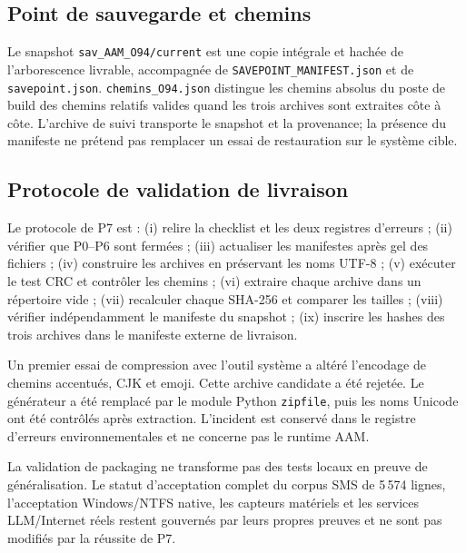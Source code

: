 \documentclass[11pt,a4paper]{article}
\begin{document}
\subsection{Point de sauvegarde et chemins}
Le snapshot \texttt{sav\_AAM\_O94/current} est une copie intégrale et hachée de l'arborescence livrable, accompagnée de \texttt{SAVEPOINT\_MANIFEST.json} et de \texttt{savepoint.json}. \texttt{chemins\_O94.json} distingue les chemins absolus du poste de build des chemins relatifs valides quand les trois archives sont extraites côte à côte. L'archive de suivi transporte le snapshot et la provenance; la présence du manifeste ne prétend pas remplacer un essai de restauration sur le système cible.

\subsection{Protocole de validation de livraison}
Le protocole de P7 est : (i) relire la checklist et les deux registres d'erreurs ; (ii) vérifier que P0--P6 sont fermées ; (iii) actualiser les manifestes après gel des fichiers ; (iv) construire les archives en préservant les noms UTF-8 ; (v) exécuter le test CRC et contrôler les chemins ; (vi) extraire chaque archive dans un répertoire vide ; (vii) recalculer chaque SHA-256 et comparer les tailles ; (viii) vérifier indépendamment le manifeste du snapshot ; (ix) inscrire les hashes des trois archives dans le manifeste externe de livraison.

Un premier essai de compression avec l'outil système a altéré l'encodage de chemins accentués, CJK et emoji. Cette archive candidate a été rejetée. Le générateur a été remplacé par le module Python \texttt{zipfile}, puis les noms Unicode ont été contrôlés après extraction. L'incident est conservé dans le registre d'erreurs environnementales et ne concerne pas le runtime AAM.

La validation de packaging ne transforme pas des tests locaux en preuve de généralisation. Le statut d'acceptation complet du corpus SMS de 5\,574 lignes, l'acceptation Windows/NTFS native, les capteurs matériels et les services LLM/Internet réels restent gouvernés par leurs propres preuves et ne sont pas modifiés par la réussite de P7.
\end{document}
